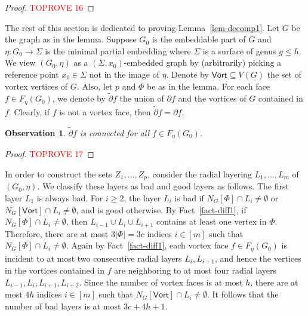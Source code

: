 \documentclass[a4paper,11pt]{article}
\numberwithin{lemma}{section}
\newtheorem{observation}[lemma]{Observation}
\begin{document}
\begin{proof}\textcolor{red}{TOPROVE 16}\end{proof}

The rest of this section is dedicated to proving Lemma~\ref{lem-decomp1}.
Let $G$ be the graph as in the lemma.
Suppose $G_0$ is the embeddable part of $G$ and $\eta\colon G_0 \rightarrow \varSigma$ is the minimal partial embedding where $\varSigma$ is a surface of genus $g \leq h$.
We view $(G_0,\eta)$ as a $(\varSigma,x_0)$-embedded graph by (arbitrarily) picking a reference point $x_0 \in \varSigma$ not in the image of $\eta$.
Denote by $\mathsf{Vort} \subseteq V(G)$ the set of vortex vertices of $G$.
Also, let $p$ and $\varPhi$ be as in the lemma.
For each face $f \in F_\eta(G_0)$, we denote by $\tilde{\partial} f$ the union of $\partial f$ and the vortices of $G$ contained in $f$.
Clearly, if $f$ is not a vortex face, then $\tilde{\partial} f = \partial f$.

\begin{observation} \label{obs-vortexfaceconn}
$\tilde{\partial} f$ is connected for all $f \in F_\eta(G_0)$.
\end{observation}

\begin{proof}\textcolor{red}{TOPROVE 17}\end{proof}

In order to construct the sets $Z_1,\dots,Z_p$, consider the radial layering $L_1,\dots,L_m$ of $(G_0,\eta)$.
We classify these layers as bad and good layers as follows.
The first layer $L_1$ is always bad.
For $i \geq 2$, the layer $L_i$ is bad if $N_G[\varPhi] \cap L_i \neq \emptyset$ or $N_G[\mathsf{Vort}] \cap L_i \neq \emptyset$, and is good otherwise.
By Fact~\ref{fact-diff1}, if $N_G[\varPhi] \cap L_i \neq \emptyset$, then $L_{i-1} \cup L_i \cup L_{i+1}$ contains at least one vertex in $\varPhi$.
Therefore, there are at most $3|\varPhi| = 3c$ indices $i \in [m]$ such that $N_G[\varPhi] \cap L_i \neq \emptyset$.
Again by Fact~\ref{fact-diff1}, each vortex face $f \in F_\eta(G_0)$ is incident to at most two consecutive radial layers $L_i,L_{i+1}$, and hence the vertices in the vortices contained in $f$ are neighboring to at most four radial layers $L_{i-1},L_i,L_{i+1},L_{i+2}$.
Since the number of vortex faces is at most $h$, there are at most $4h$ indices $i \in [m]$ such that $N_G[\mathsf{Vort}] \cap L_i \neq \emptyset$.
It follows that the number of bad layers is at most $3c+4h+1$.
\end{document}
